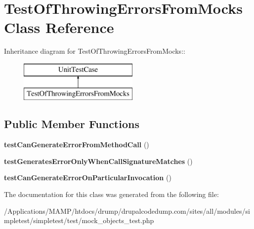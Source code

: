 \hypertarget{class_test_of_throwing_errors_from_mocks}{
\section{TestOfThrowingErrorsFromMocks Class Reference}
\label{class_test_of_throwing_errors_from_mocks}
}
Inheritance diagram for TestOfThrowingErrorsFromMocks::\begin{figure}[H]
\begin{center}
\leavevmode
\includegraphics[height=2cm]{class_test_of_throwing_errors_from_mocks}
\end{center}
\end{figure}
\subsection*{Public Member Functions}
\begin{DoxyCompactItemize}
\item 
\hypertarget{class_test_of_throwing_errors_from_mocks_a209bb087f2e0bc207859496e76bb0aed}{
{\bfseries testCanGenerateErrorFromMethodCall} ()}
\label{class_test_of_throwing_errors_from_mocks_a209bb087f2e0bc207859496e76bb0aed}

\item 
\hypertarget{class_test_of_throwing_errors_from_mocks_a901c28574cadfe822be88977c9eee7c0}{
{\bfseries testGeneratesErrorOnlyWhenCallSignatureMatches} ()}
\label{class_test_of_throwing_errors_from_mocks_a901c28574cadfe822be88977c9eee7c0}

\item 
\hypertarget{class_test_of_throwing_errors_from_mocks_a7100e8ef4df8627ff1332b87bcf7aa9c}{
{\bfseries testCanGenerateErrorOnParticularInvocation} ()}
\label{class_test_of_throwing_errors_from_mocks_a7100e8ef4df8627ff1332b87bcf7aa9c}

\end{DoxyCompactItemize}


The documentation for this class was generated from the following file:\begin{DoxyCompactItemize}
\item 
/Applications/MAMP/htdocs/drump/drupalcodedump.com/sites/all/modules/simpletest/simpletest/test/mock\_\-objects\_\-test.php\end{DoxyCompactItemize}
